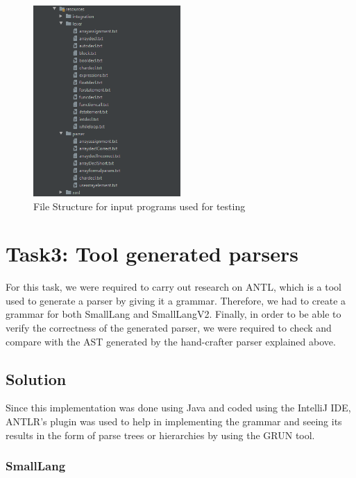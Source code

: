 \documentclass{article}
\begin{document}
					\begin{figure}[H]
					\centering
			 			\includegraphics[width=0.5\textwidth]{filestestingpart2.png}
			  			\caption{File Structure for input programs used for testing}
			  			\label{fig:filestructure}
					\end{figure}
					
					
		\section{Task3: Tool generated parsers}
		
		For this task, we were required to carry out research on ANTL, which is a tool used to generate a parser by giving it a grammar. Therefore, we had to create a grammar for both SmallLang and SmallLangV2. Finally, in order to be able to verify the correctness of the generated parser, we were required to check and compare with the AST generated by the hand-crafter parser explained above.
		
		
			\subsection{Solution}
			
			Since this implementation was done using Java and coded using the IntelliJ IDE, ANTLR's plugin\cite{ANTLRplugin} was used to help in implementing the grammar and seeing its results in the form of parse trees or hierarchies by using the GRUN tool. 
				
			\subsubsection{SmallLang}
			
\end{document}
